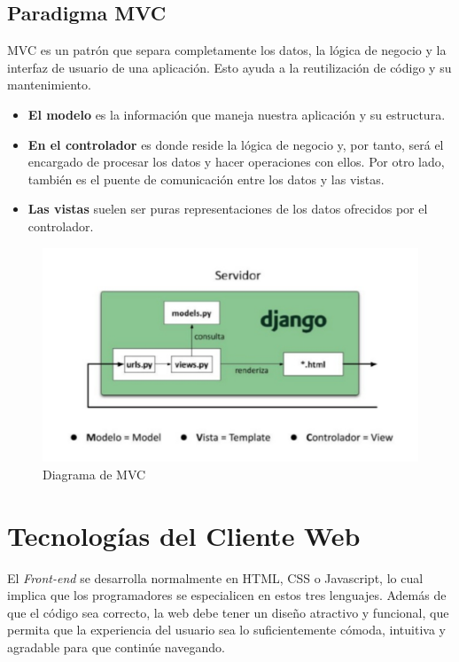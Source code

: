 \subsection{Paradigma MVC}
MVC es un patrón que separa completamente los datos, la lógica de negocio y la interfaz de usuario de una aplicación. Esto ayuda a la reutilización de código y su mantenimiento.

\begin{itemize}
\item \textbf {El modelo} es la información que maneja nuestra aplicación y su estructura.
\item \textbf {En el controlador} es donde reside la lógica de negocio y, por tanto, será el encargado de procesar los datos y hacer operaciones con ellos. Por otro lado, también es el puente de comunicación entre los datos y las vistas.
\item \textbf {Las vistas} suelen ser puras representaciones de los datos ofrecidos por el controlador.
\end{itemize}
\begin{figure}[!h]
    \centering
    \includegraphics[width=120mm]{img/introduccion/mvc.png}
    \caption{Diagrama de MVC}
\end{figure}

\section{Tecnologías del Cliente Web}

El \textit{Front-end} se desarrolla normalmente en HTML, CSS o Javascript, lo cual implica que los programadores se especialicen en estos tres lenguajes. Además de que el código sea correcto, la web debe tener un diseño atractivo y funcional, que permita que la experiencia del usuario sea lo suficientemente cómoda, intuitiva y agradable para que continúe navegando.

